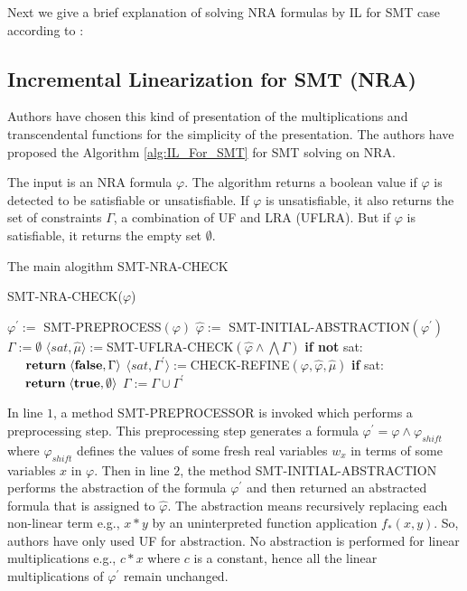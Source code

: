 \noindent Next we give a brief explanation of solving NRA formulas by IL for SMT case according to \cite{Cimatti:2018:ILS:3274693.3230639}:
\subsection{Incremental Linearization for SMT (NRA)}
\label{subsec:IL_For_SMT}
Authors have chosen this kind of presentation of the multiplications and transcendental functions for the simplicity of the presentation.
The authors have proposed the Algorithm \ref{alg:IL_For_SMT} for SMT solving on NRA.\newline

\noindent The input is an NRA formula $\varphi$.
The algorithm returns a boolean value if $\varphi$ is detected to be satisfiable or unsatisfiable.
If $\varphi$ is unsatisfiable, it also returns the set of constraints $\Gamma$, a combination of UF and LRA (UFLRA).
But if $\varphi$ is satisfiable, it returns the empty set $\emptyset$.\newline

\begin{algorithm}
\caption{The main alogithm SMT-NRA-CHECK \cite{Cimatti:2018:ILS:3274693.3230639}} 
\label{alg:IL_For_SMT}
SMT-NRA-CHECK($\varphi$)
\begin{algorithmic}[1]
\State $\varphi^\prime :=$ SMT-PREPROCESS$(\varphi)$
\State $\hat{\varphi} :=$ SMT-INITIAL-ABSTRACTION$(\varphi^\prime)$
\State $\Gamma := \emptyset$
\State $\langle sat, \hat{\mu} \rangle := $SMT-UFLRA-CHECK$(\hat{\varphi} \wedge \bigwedge \Gamma)$
\State \textbf{if not} sat:
\State $\hspace{5mm} \textbf{return} \hspace{1mm}\langle \textbf{false}, \Gamma \rangle$
\State $\langle sat, \Gamma^\prime \rangle := $CHECK-REFINE$(\varphi, \hat{\varphi}, \hat{\mu})$
\State \textbf{if} sat:
\State $\hspace{5mm} \textbf{return} \hspace{1mm}\langle \textbf{true}, \emptyset \rangle$
\State $\Gamma := \Gamma \cup \Gamma^\prime$
\EndWhile
\end{algorithmic}
\end{algorithm}

\noindent In line $1$, a method SMT-PREPROCESSOR is invoked which performs a preprocessing step.
This preprocessing step generates  a formula $\varphi^{\prime} = \varphi \wedge \varphi_{shift}$ where $\varphi_{shift}$ defines the values of some fresh real variables $w_{x}$ in terms of some variables $x$ in $\varphi$.
Then in line $2$, the method SMT-INITIAL-ABSTRACTION performs the abstraction of the formula $\varphi^{\prime}$ and then returned an abstracted formula that is assigned to $\hat{\varphi}$.
The abstraction means recursively replacing each non-linear term e.g., $x \ast y$ by an uninterpreted function application $f_{\ast}(x, y)$.
So, authors have only used UF for abstraction.
No abstraction is performed for linear multiplications e.g., $c \ast x$ where $c$ is a constant, hence all the linear multiplications of $\varphi^{\prime}$ remain unchanged.\newline

